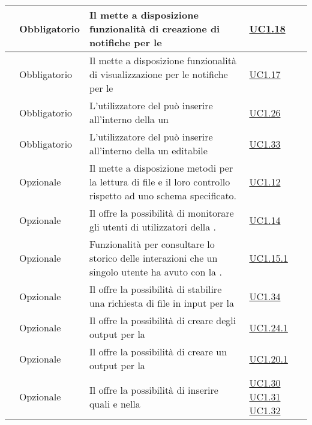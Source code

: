 \begin{longtable}{|P{1.5cm}|P{2.5cm}|P{6.5cm}|P{2.5cm}|}
	\hline \RequisitoObF\label{L15} & Obbligatorio & Il  mette a disposizione funzionalità di creazione di notifiche per le  & \hyperref[UC1.18]{UC1.18} \\
	\hline \RequisitoObF\label{L16} & Obbligatorio & Il  mette a disposizione funzionalità di visualizzazione per le notifiche per le  & \hyperref[UC1.17]{UC1.17} \\
	\hline \RequisitoObF\label{L33} & Obbligatorio & L'utilizzatore del  può inserire all'interno della  un  & \hyperref[UC1.26]{UC1.26} \\
	\hline \RequisitoObF\label{L34} & Obbligatorio & L'utilizzatore del  può inserire all'interno della  un  editabile & \hyperref[UC1.33]{UC1.33} \\
	\hline \RequisitoOpF\label{L35} & Opzionale & Il  mette a disposizione metodi per la lettura di file  e il loro controllo rispetto ad uno schema specificato. & \hyperref[UC1.12]{UC1.12} \\
	\hline \RequisitoOpF\label{L36} & Opzionale & Il  offre la possibilità di monitorare gli utenti di  utilizzatori della . & \hyperref[UC1.14]{UC1.14} \\
	\hline \RequisitoOpF\label{L37} & Opzionale & Funzionalità per consultare lo storico delle interazioni che un singolo utente ha avuto con la . & \hyperref[UC1.15.1]{UC1.15.1} \\
	\hline \RequisitoOpF\label{L38} & Opzionale & Il  offre la possibilità di stabilire una richiesta di file in input per la  & \hyperref[UC1.34]{UC1.34} \\
	\hline \RequisitoOpF\label{L39} & Opzionale & Il  offre la possibilità di creare degli output per la  & \hyperref[UC1.24.1]{UC1.24.1} \\
	\hline \RequisitoOpF\label{L40} & Opzionale & Il  offre la possibilità di creare un output  per la  & \hyperref[UC1.20.1]{UC1.20.1} \\	
	\hline \RequisitoOpF\label{L41} & Opzionale & Il  offre la possibilità di inserire  quali  e  nella  & \hyperref[UC1.30]{UC1.30} \linebreak \hyperref[UC1.31]{UC1.31} \linebreak \hyperref[UC1.32]{UC1.32} \\

\end{longtable}
